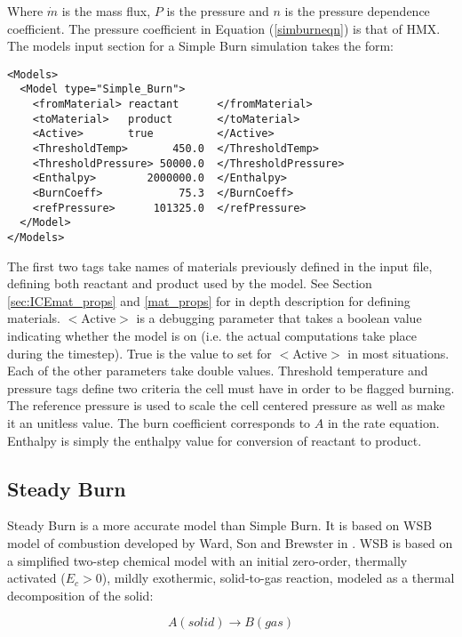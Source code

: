 Where $\dot{m}$ is the mass flux, $P$ is the pressure and $n$ is the pressure dependence coefficient.  The pressure coefficient in Equation (\ref{simburneqn}) is that of HMX.  The models input section for a Simple Burn simulation takes the form: 

\begin{verbatim}
<Models>
  <Model type="Simple_Burn">
    <fromMaterial> reactant      </fromMaterial>
    <toMaterial>   product       </toMaterial>
    <Active>       true          </Active>
    <ThresholdTemp>       450.0  </ThresholdTemp>
    <ThresholdPressure> 50000.0  </ThresholdPressure>
    <Enthalpy>        2000000.0  </Enthalpy>
    <BurnCoeff>            75.3  </BurnCoeff>
    <refPressure>      101325.0  </refPressure>
  </Model>
</Models>
\end{verbatim}

The first two tags take names of materials previously defined in the input file, defining both reactant and product used by the model.  See Section \ref{sec:ICEmat_props} and \ref{mat_props} for in depth description for defining materials.  $<$Active$>$ is a debugging parameter that takes a boolean value indicating whether the model is on (i.e. the actual computations take place during the timestep).  True is the value to set for $<$Active$>$ in most situations.  Each of the other parameters take double values.  Threshold temperature and pressure tags define two criteria the cell must have in order to be flagged burning.  The reference pressure is used to scale the cell centered pressure as well as make it an unitless value.  The burn coefficient corresponds to $A$ in the rate equation.  Enthalpy is simply the enthalpy value for conversion of reactant to product.
\newpage
\subsection{Steady Burn} \label{Sec:SteadyBurn}

Steady Burn is a more accurate model than Simple Burn.  It is based on WSB model of combustion developed by Ward, Son and Brewster in \cite{ref:wardsonbrewster}.  WSB is based on a simplified two-step chemical model with an initial zero-order, thermally activated ($E_c > 0$), mildly exothermic, solid-to-gas reaction, modeled as a thermal decomposition of the solid:

\begin{equation}
A(solid)\rightarrow B(gas)
\end{equation}

